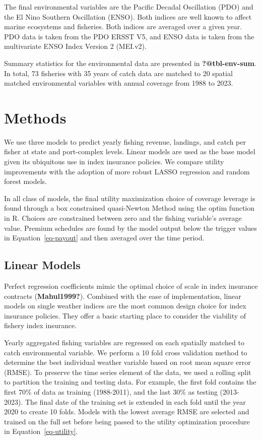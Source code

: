 \documentclass[
  letterpaper,
  DIV=11,
  numbers=noendperiod]{scrartcl}
\begin{document}
The final environmental variables are the Pacific Decadal Oscillation
(PDO) and the El Nino Southern Oscillation (ENSO). Both indices are well
known to affect marine ecosystems and fisheries. Both indices are
averaged over a given year. PDO data is taken from the PDO ERSST V5, and
ENSO data is taken from the multivariate ENSO Index Version 2 (MEI.v2).

Summary statistics for the environmental data are presented in
\textbf{?@tbl-env-sum}. In total, 73 fisheries with 35 years of catch
data are matched to 20 spatial matched environmental variables with
annual coverage from 1988 to 2023.

\hypertarget{sec-methods}{%
\section{Methods}\label{sec-methods}}

We use three models to predict yearly fishing revenue, landings, and
catch per fisher at state and port-complex levels. Linear models are
used as the base model given its ubiquitous use in index insurance
policies. We compare utility improvements with the adoption of more
robust LASSO regression and random forest models.

In all class of models, the final utility maximization choice of
coverage leverage is found through a box constrained quasi-Newton Method
using the optim function in R. Choices are constrained between zero and
the fishing variable's average value. Premium schedules are found by the
model output below the trigger values in Equation~\ref{eq-payout} and
then averaged over the time period.

\hypertarget{linear-models}{%
\subsection{Linear Models}\label{linear-models}}

Perfect regression coefficients mimic the optimal choice of scale in
index insurance contracts (\textbf{Mahul1999?}). Combined with the ease
of implementation, linear models on single weather indices are the most
common design choice for index insurance policies. They offer a basic
starting place to consider the viability of fishery index insurance.

Yearly aggregated fishing variables are regressed on each spatially
matched to catch environmental variable. We perform a 10 fold cross
validation method to determine the best individual weather variable
based on root mean square error (RMSE). To preserve the time series
element of the data, we used a rolling split to partition the training
and testing data. For example, the first fold contains the first 70\% of
data as training (1988-2011), and the last 30\% as testing (2013-2023).
The final date of the training set is extended in each fold until the
year 2020 to create 10 folds. Models with the lowest average RMSE are
selected and trained on the full set before being passed to the utility
optimization procedure in Equation~\ref{eq-utility}.
\end{document}
